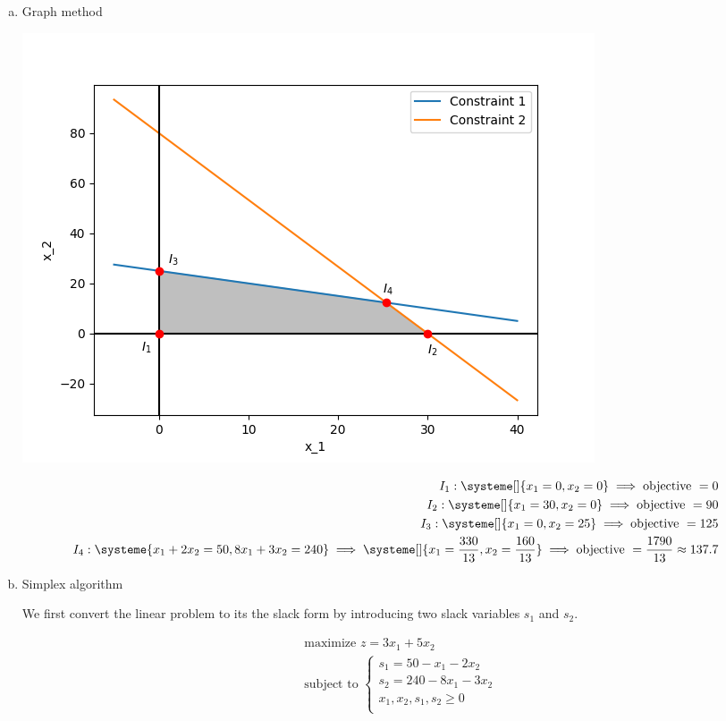 \documentclass[a4paper, 10pt, twoside]{article}
\begin{document}
\begin{enumerate}[a)]
    \item Graph method
          \begin{center}
              \includegraphics[width = .5 \textwidth]{graph3.png}
          \end{center}

          \begin{align*}
              I_1 :
              \systeme[]{
                  x_1 = 0,
                  x_2 = 0
              }
              \implies \text{objective } = 0                             \\
              I_2 :
              \systeme[]{
                  x_1 = 30,
                  x_2 = 0
              }
              \implies \text{objective } = 90                            \\
              I_3 :
              \systeme[]{
                  x_1 = 0,
                  x_2 = 25
              }
              \implies \text{objective } = 125                           \\
              I_4 :
              \systeme{
                  x_1+2x_2=50,
                  8x_1+3x_2=240
              }
              \implies
              \systeme[]{
                  x_1 = \frac{330}{13},
                  x_2 = \frac{160}{13}
              }
              \implies \text{objective } = \frac{1790}{13} \approx 137.7 \\
          \end{align*}

    \item Simplex algorithm

          We first convert the linear problem to its the slack form by introducing two slack variables $s_1$ and $s_2$.

          \begin{align*}
               & \text{maximize } z = 3x_1 + 5x_2 \\
               & \text{subject to }
              \begin{cases}
                  s_1 = 50 - x_1 - 2x_2    \\
                  s_2 = 240 - 8x_1 - 3x_2  \\
                  x_1, x_2, s_1, s_2 \ge 0 \\
              \end{cases}
          \end{align*}


\end{enumerate}
\end{document}
